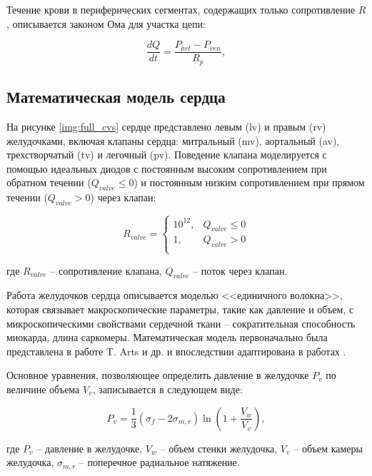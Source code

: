 Течение крови в периферических сегментах, содержащих только сопротивление $R$, описывается законом Ома для участка цепи:

\begin{equation}
	\frac{ dQ }{dt} = \frac{ P_{art} - P_{ven} }{ R_{p} },
\end{equation}

\subsection*{Математическая модель сердца}

На рисунке \ref{img:full_cvs} сердце представлено левым (lv) и правым (rv) желудочками, включая клапаны сердца: митральный (mv), аортальный (av), трехстворчатый (tv) и легочный (pv). Поведение клапана моделируется с помощью идеальных диодов с постоянным высоким сопротивлением при обратном течении ($Q_{valve} \leq 0$) и постоянным низким сопротивлением при прямом течении ($Q_{valve} > 0$) через клапан:

\begin{equation}
	R_{valve} =  \begin{cases} 10^{12}, & Q_{valve} \leq 0 \\ 1, & Q_{valve} > 0 \\ \end{cases} 
\end{equation}

\noindent где $R_{valve}$ -- сопротивление клапана, $Q_{valve}$ -- поток через клапан. 

Работа желудочков сердца описывается моделью <<единичного волокна>>, которая связывает макроскопические параметры, такие как давление и объем, с микроскопическими свойствами сердечной ткани -- сократительная способность миокарда, длина саркомеры. Математическая модель первоначально была представлена в работе T. Arts и др. \cite{Arts_1991} и впоследствии адаптирована в работах \cite{Arts2003731, Bovendeerd_2006}. %
 
Основное уравнения, позволяющее определить давление в желудочке $P_v$ по величине объема $V_v$, записывается в следующем виде:

\begin{equation}
	\label{eq:heart}
	P_v = \frac{1}{3} (\sigma_f - 2 \sigma_{m,r}) \ln \left(1 + \frac{V_w}{V_v}\right),
\end{equation}

\noindent где $P_v$ -- давление в желудочке, $V_w$ -- объем стенки желудочка, $V_v$ -- объем камеры желудочка, $\sigma_{m,r}$ -- поперечное радиальное натяжение. 

